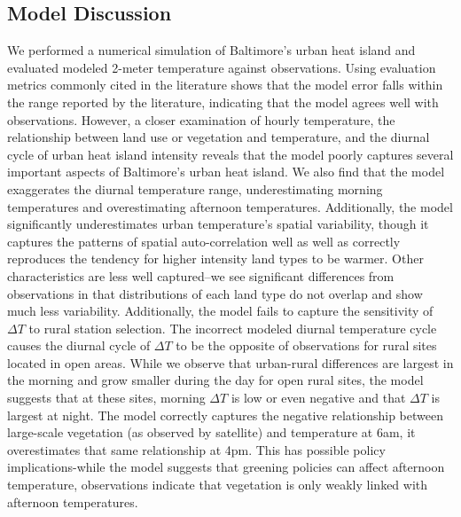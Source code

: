 \documentclass[draft,linenumbers]{agujournal}
\begin{document}
\subsection{Model Discussion}
We performed a numerical simulation of Baltimore's urban heat island and evaluated modeled 2-meter temperature against observations. 
Using evaluation metrics commonly cited in the literature shows that the model error falls within the range reported by the literature, indicating that the model agrees well with observations. 
However, a closer examination of hourly temperature, the relationship between land use or vegetation and temperature, and the diurnal cycle of urban heat island intensity reveals that the model poorly captures several important aspects of Baltimore's urban heat island. 
We also find %
that the model exaggerates the diurnal temperature range, underestimating morning temperatures and overestimating afternoon temperatures. 
Additionally, the model significantly underestimates urban temperature's spatial variability, though it captures the patterns of spatial auto-correlation well as well as correctly reproduces the tendency for higher intensity land types to be warmer. 
Other characteristics are less well captured--we see significant differences from observations in that distributions of each land type do not overlap and show much less variability. 
Additionally, the model fails to capture the sensitivity of $\Delta T$ to rural station selection. 
The incorrect modeled diurnal temperature cycle causes the diurnal cycle of $\Delta T$ to be the opposite of observations for rural sites located in open areas. 
While we observe that urban-rural differences are largest in the morning and grow smaller during the day for open rural sites, the model suggests that at these sites, morning $\Delta T$ is low or even negative and that $\Delta T$ is largest at night. 
The model %
correctly captures the negative relationship between large-scale vegetation (as observed by satellite) and temperature at 6am, it overestimates that same relationship at 4pm. This has possible policy implications-while the model suggests that greening policies can affect afternoon temperature, observations indicate that vegetation is only weakly linked with afternoon temperatures.
% 
\end{document}
